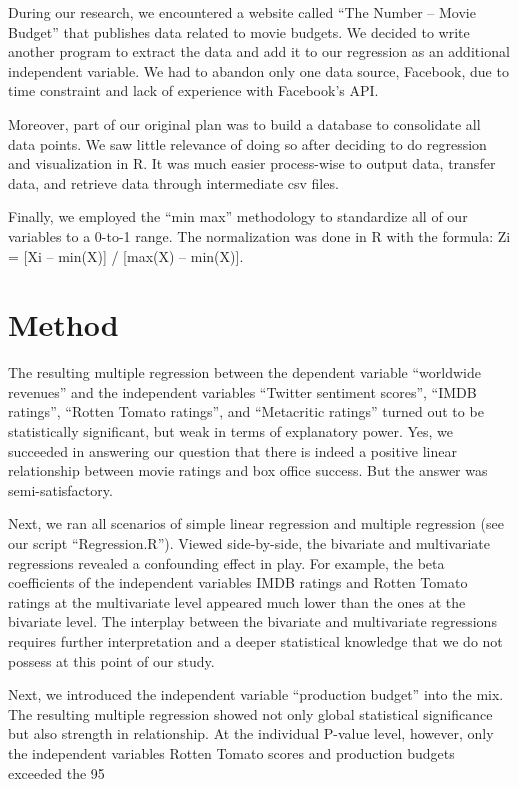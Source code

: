 \documentclass{article}
\begin{document}
During our research, we encountered a website called “The Number – Movie Budget” that publishes data related to movie budgets.  We decided to write another program to extract the data and add it to our regression as an additional independent variable.  We had to abandon only one data source, Facebook, due to time constraint and lack of experience with Facebook’s API.   

Moreover, part of our original plan was to build a database to consolidate all data points.  We saw little relevance of doing so after deciding to do regression and visualization in R.  It was much easier process-wise to output data, transfer data, and retrieve data through intermediate csv files.

Finally, we employed the “min max” methodology to standardize all of our variables to a 0-to-1 range.  The normalization was done in R with the formula:  Zi = [Xi – min(X)] / [max(X) – min(X)].


\section{Method}

The resulting multiple regression between the dependent variable “worldwide revenues” and the independent variables “Twitter sentiment scores”, “IMDB ratings”, “Rotten Tomato ratings”, and “Metacritic ratings” turned out to be statistically significant, but weak in terms of explanatory power.  Yes, we succeeded in answering our question that there is indeed a positive linear relationship between movie ratings and box office success.  But the answer was semi-satisfactory.

Next, we ran all scenarios of simple linear regression and multiple regression (see our script “Regression.R”).  Viewed side-by-side, the bivariate and multivariate regressions revealed a confounding effect in play.  For example, the beta coefficients of the independent variables IMDB ratings and Rotten Tomato ratings at the multivariate level appeared much lower than the ones at the bivariate level.  The interplay between the bivariate and multivariate regressions requires further interpretation and a deeper statistical knowledge that we do not possess at this point of our study.

Next, we introduced the independent variable “production budget” into the mix.  The resulting multiple regression showed not only global statistical significance but also strength in relationship.  At the individual P-value level, however, only the independent variables Rotten Tomato scores and production budgets exceeded the 95%
\end{document}
